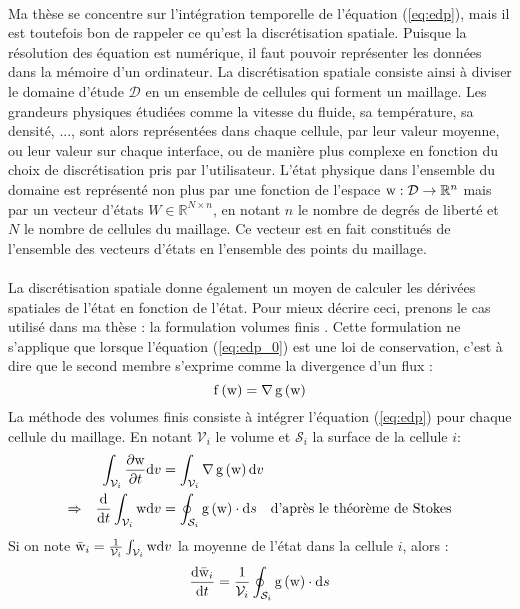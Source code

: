 		\paragraph{}
		Ma thèse se concentre sur l'intégration temporelle de l'équation (\ref{eq:edp}), mais il est toutefois bon de rappeler ce qu'est la discrétisation spatiale.
		Puisque la résolution des équation est numérique, il faut pouvoir représenter les données dans la mémoire d'un ordinateur.
		La discrétisation spatiale consiste ainsi à diviser le domaine d'étude $\mathcal{D}$ en un ensemble de cellules qui forment un maillage.
		Les grandeurs physiques étudiées comme la vitesse du fluide, sa température, sa densité, ..., sont alors représentées dans chaque cellule, par leur valeur moyenne, ou leur valeur sur chaque interface, ou de manière plus complexe en fonction du choix de discrétisation pris par l'utilisateur.
		L'état physique dans l'ensemble du domaine est représenté non plus par une fonction de l'espace $\textup{w} : \mathcal{D} \rightarrow \mathbb{R}^n$ mais par un vecteur d'états $W \in \mathbb{R}^{N\times n}$, en notant $n$ le nombre de degrés de liberté et $N$ le nombre de cellules du maillage.
		Ce vecteur est en fait constitués de l'ensemble des vecteurs d'états en l'ensemble des points du maillage.

		\paragraph{}
		La discrétisation spatiale donne également un moyen de calculer les dérivées spatiales de l'état en fonction de l'état.
		Pour mieux décrire ceci, prenons le cas utilisé dans ma thèse : la formulation volumes finis \cite{EymardGallouetHerbin2000}.
		Cette formulation ne s'applique que lorsque l'équation (\ref{eq:edp_0}) est une loi de conservation, c'est à dire que le second membre s'exprime comme la divergence d'un flux :
		\[\operatorname{f}\left(\textup{w}\right) = \nabla\operatorname{g}\left(\textup{w}\right)\]
		La méthode des volumes finis consiste à intégrer l'équation (\ref{eq:edp}) pour chaque cellule du maillage.
		En notant $\mathcal{V}_i$ le volume et $\mathcal{S}_i$ la surface de la cellule $i$:
		\begin{align*}
			&&\int_{\mathcal{V}_i}\frac{\partial\textup{w}}{\partial t}\mathrm{d}v &= \int_{\mathcal{V}_i}\nabla\operatorname{g}\left(\textup{w}\right)\mathrm{d}v \\
			\Rightarrow&&\frac{\mathrm{d}}{\mathrm{d}t}\int_{\mathcal{V}_i}\textup{w}\mathrm{d}v &= \oint_{\mathcal{S}_i}\operatorname{g}\left(\textup{w}\right)\cdot\mathrm{d}s\quad\textrm{d'après le théorème de Stokes}
		\end{align*}
		Si on note $\bar{\textup{w}}_i = \frac{1}{\mathcal{V}_i}\int_{\mathcal{V}_i}\textup{w}\mathrm{d}v$ la moyenne de l'état dans la cellule $i$, alors :
		\[\frac{\mathrm{d}\bar{\textup{w}}_i}{\mathrm{d}t} = \frac{1}{\mathcal{V}_i}\oint_{\mathcal{S}_i}\operatorname{g}\left(\textup{w}\right)\cdot\mathrm{d}s\]


